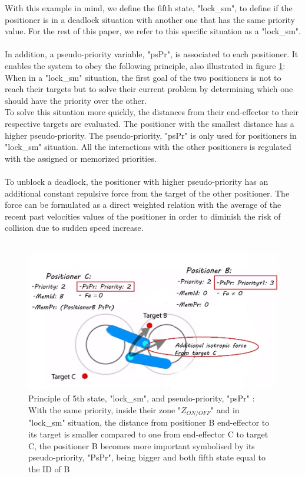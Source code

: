\documentclass[]{spie}  %
\begin{document}
	With this example in mind, we define the fifth state, "lock\_sm", to define if the positioner is in a deadlock situation with another one that has the same priority value. For the rest of this paper, we refer to this specific situation as a "lock\_sm". \\\\
	In addition, a pseudo-priority variable, "psPr", is associated to each positioner. It enables the system to obey the following principle, also illustrated in figure \ref{5thState}:\\
	When in a "lock\_sm" situation, the first goal of the two positioners is not to reach their targets but to solve their current problem by determining which one should have the priority over the other. \\
	 To solve this situation more quickly, the distances from their end-effector to their respective targets are evaluated. The positioner with the smallest distance has a higher pseudo-priority. The pseudo-priority, "psPr" is only used for positioners in "lock\_sm" situation. All the interactions with the other positioners is regulated with the assigned or memorized priorities. \\\\
	To unblock a deadlock, the positioner with higher pseudo-priority has an additional constant repulsive force from the target of the other positioner. The force can be formulated as a direct weighted relation with the average of the recent past velocities values of the positioner in order to diminish the risk of collision due to sudden speed increase.\\\\
	
	\begin{figure}[H]
		\centering
		\includegraphics[scale=0.4]{images/5thstate.jpg}
		\caption{\centering Principle of 5th state, "lock\_sm", and pseudo-priority, "psPr" :\\
		With the same priority, inside their zone "$Z_{ON/OFF}$" and in "lock\_sm" situation, the distance from positioner B end-effector to its target is smaller compared to one from end-effector C to target C, the positioner B becomes more important symbolised by its pseudo-priority, "PsPr", being bigger and both fifth state equal to the ID of B}
		\label{5thState}
	\end{figure}
	
\end{document}
